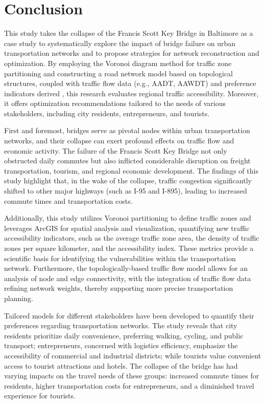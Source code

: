 \documentclass{mcmthesis}
\begin{document}
\section{Conclusion}

This study\cite{mta2025} takes the collapse of the Francis Scott Key Bridge in Baltimore as a case study to systematically explore the impact of bridge failure on urban transportation networks and to propose strategies for network reconstruction and optimization. By employing the Voronoi diagram method for traffic zone partitioning and constructing a road network model based on topological structures, coupled with traffic flow data (e.g., AADT, AAWDT) and preference indicators derived , this research evaluates regional traffic accessibility. Moreover, it offers optimization recommendations tailored to the needs of various stakeholders, including city residents, entrepreneurs, and tourists.

First and foremost, bridges serve as pivotal nodes within urban transportation networks, and their collapse can exert profound effects on traffic flow and economic activity. The failure of the Francis Scott Key Bridge not only obstructed daily commutes but also inflicted considerable disruption on freight transportation, tourism, and regional economic development. The findings of this study highlight that, in the wake of the collapse, traffic congestion significantly shifted to other major highways (such as I-95 and I-895), leading to increased commute times and transportation costs.

Additionally, this study utilizes Voronoi partitioning to define traffic zones and leverages ArcGIS for spatial analysis and visualization, quantifying new traffic accessibility indicators, such as the average traffic zone area, the density of traffic zones per square kilometer, and the accessibility index. These metrics provide a scientific basis for identifying the vulnerabilities within the transportation network. Furthermore, the topologically-based traffic flow model allows for an analysis of node and edge connectivity, with the integration of traffic flow data refining network weights, thereby supporting more precise transportation planning.

Tailored models for different stakeholders have been developed to quantify their preferences regarding transportation networks. The study reveals that city residents prioritize daily convenience, preferring walking, cycling, and public transport; entrepreneurs, concerned with logistics efficiency, emphasize the accessibility of commercial and industrial districts; while tourists value convenient access to tourist attractions and hotels. The collapse of the bridge has had varying impacts on the travel needs of these groups: increased commute times for residents, higher transportation costs for entrepreneurs, and a diminished travel experience for tourists.
\end{document}
